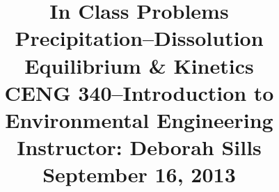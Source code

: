 \documentclass[12pt,letterpaper]{article}
\begin{document}
\setlength{\parindent}{0cm} 


\frenchspacing






\title {\large{In Class Problems} \\ 
{\large \textbf{Precipitation--Dissolution Equilibrium \& Kinetics}\\CENG 340--Introduction to Environmental Engineering\\
Instructor: Deborah Sills\\September 16, 2013}}

\author{}

\date {}
\maketitle

\vspace{-1.0in}
\end{document}
